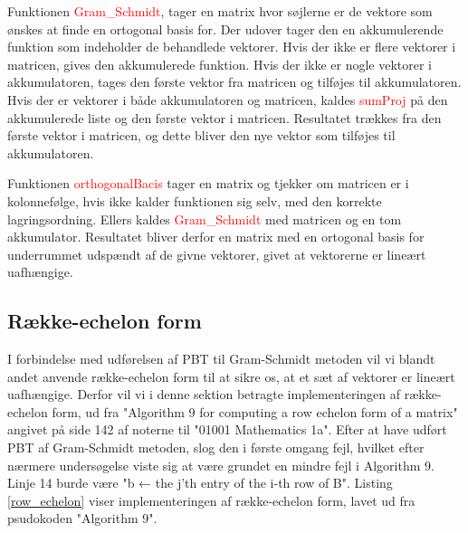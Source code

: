 Funktionen \textcolor{red}{Gram\_Schmidt}, tager en matrix hvor søjlerne er de vektore som ønskes at finde en ortogonal basis for. Der udover tager den en akkumulerende funktion som indeholder de behandlede vektorer. Hvis der ikke er flere vektorer i matricen, gives den akkumulerede funktion. Hvis der ikke er nogle vektorer i akkumulatoren, tages den første vektor fra matricen og tilføjes til akkumulatoren. Hvis der er vektorer i både akkumulatoren og matricen, kaldes \textcolor{red}{sumProj} på den akkumulerede liste og den første vektor i matricen. Resultatet trækkes fra den første vektor i matricen, og dette bliver den nye vektor som tilføjes til akkumulatoren. 

Funktionen \textcolor{red}{orthogonalBacis} tager en matrix og tjekker om matricen er i kolonnefølge, hvis ikke kalder funktionen sig selv, med den korrekte lagringsordning. Ellers kaldes \textcolor{red}{Gram\_Schmidt} med matricen og en tom akkumulator. Resultatet bliver derfor en matrix med en ortogonal basis for underrummet udspændt af de givne vektorer, givet at vektorerne er lineært uafhængige.

\subsection{Række-echelon form}
I forbindelse med udførelsen af PBT til Gram-Schmidt metoden vil vi blandt andet anvende række-echelon form til at sikre os, at et sæt af vektorer er lineært uafhængige. Derfor vil vi i denne sektion betragte implementeringen af række-echelon form, ud fra "Algorithm 9 for computing a row echelon form of a matrix" angivet på side 142 af noterne til "01001 Mathematics 1a". Efter at have udført PBT af Gram-Schmidt metoden, slog den i første omgang fejl, hvilket efter nærmere undersøgelse viste sig at være grundet en mindre fejl i Algorithm 9. Linje 14 burde være "b ← the j'th entry of the i-th row of B".  Listing \ref{row_echelon} viser implementeringen af række-echelon form, lavet ud fra psudokoden "Algorithm 9".

